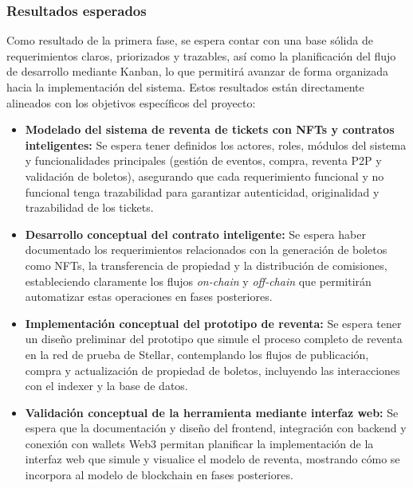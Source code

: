\documentclass[12pt,a4paper]{article}
\begin{document}
\subsubsection{Resultados esperados}
Como resultado de la primera fase, se espera contar con una base sólida de
requerimientos claros, priorizados y trazables, así como la planificación del
flujo de desarrollo mediante Kanban, lo que permitirá avanzar de forma organizada
hacia la implementación del sistema. Estos resultados están directamente
alineados con los objetivos específicos del proyecto:

\begin{itemize}
    \item \textbf{Modelado del sistema de reventa de tickets con NFTs y contratos inteligentes:}
    Se espera tener definidos los actores, roles, módulos del sistema y
    funcionalidades principales (gestión de eventos, compra, reventa P2P y
    validación de boletos), asegurando que cada requerimiento funcional y no
    funcional tenga trazabilidad para garantizar autenticidad, originalidad y
    trazabilidad de los tickets.

    \item \textbf{Desarrollo conceptual del contrato inteligente:}
    Se espera haber documentado los requerimientos relacionados con la generación
    de boletos como NFTs, la transferencia de propiedad y la distribución de
    comisiones, estableciendo claramente los flujos \textit{on-chain} y
    \textit{off-chain} que permitirán automatizar estas operaciones en fases
    posteriores.

    \item \textbf{Implementación conceptual del prototipo de reventa:}
    Se espera tener un diseño preliminar del prototipo que simule el proceso
    completo de reventa en la red de prueba de Stellar, contemplando los flujos
    de publicación, compra y actualización de propiedad de boletos, incluyendo
    las interacciones con el indexer y la base de datos.

    \item \textbf{Validación conceptual de la herramienta mediante interfaz web:}
    Se espera que la documentación y diseño del frontend, integración con backend
    y conexión con wallets Web3 permitan planificar la implementación de la
    interfaz web que simule y visualice el modelo de reventa, mostrando cómo se
    incorpora al modelo de blockchain en fases posteriores.
\end{itemize}
\end{document}
